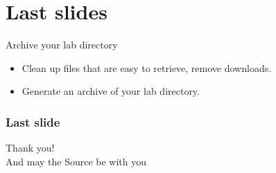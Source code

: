 \section{Last slides}

\setuplabframe
{Archive your lab directory}
{
  \begin{itemize}
  \item Clean up files that are easy to retrieve, remove downloads.
  \item Generate an archive of your lab directory.
  \end{itemize}
}


\begin{frame}
  \frametitle{Last slide}
  \begin{center}
    \Huge
    Thank you!\\
    \huge
    And may the Source be with you\\
  \end{center}
\end{frame}
